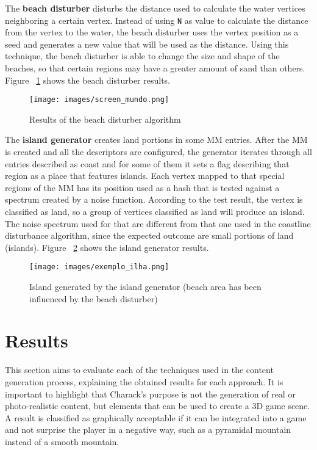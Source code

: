 \documentclass[10pt, conference, compsocconf]{IEEEtran}
\begin{document}
The \textbf{beach disturber} disturbs the distance used to calculate the water vertices neighboring a certain vertex. Instead of using {\tt N} as value to calculate the distance from the vertex to the water, the beach disturber uses the vertex position as a seed and generates a new value that will be used as the distance. Using this technique, the beach disturber is able to change the size and shape of the beaches, so that certain regions may have a greater amount of sand than others. Figure ~\ref{fig:exemplo_praia_complexa} shows the beach disturber results.

\begin{figure}
\centering
\texttt{[image: images/screen\_mundo.png]}
\caption{Results of the beach disturber algorithm}
\label{fig:exemplo_praia_complexa}
\end{figure}

The \textbf{island generator} creates land portions in some MM entries. After the MM is created and all the descriptors are configured, the generator iterates through all entries described as coast and for some of them it sets a flag describing that region as a place that features islands. Each vertex mapped to that special regions of the MM has its position used as a hash that is tested against a spectrum created by a noise function. According to the test result, the vertex is classified as land, so a group of vertices classified as land will produce an island. The noise spectrum used for that are different from that one used in the coastline disturbance algorithm, since the expected outcome are small portions of land (islands). Figure ~\ref{fig:exemplo_ilha} shows the island generator results. 

\begin{figure}
\centering
\texttt{[image: images/exemplo\_ilha.png]}
\caption{Island generated by the island generator (beach area has been influenced by the beach disturber)}
\label{fig:exemplo_ilha}
\end{figure}



\section{Results}
\label{sec:results}

This section aims to evaluate each of the techniques used in the content generation process, explaining the obtained results for each approach. It is important to highlight that Charack's purpose is not the generation of real or photo-realistic content, but elements that can be used to create a 3D game scene. A result is classified as graphically acceptable if it can be integrated into a game and not surprise the player in a negative way, such as a pyramidal mountain instead of a smooth mountain.
\end{document}
